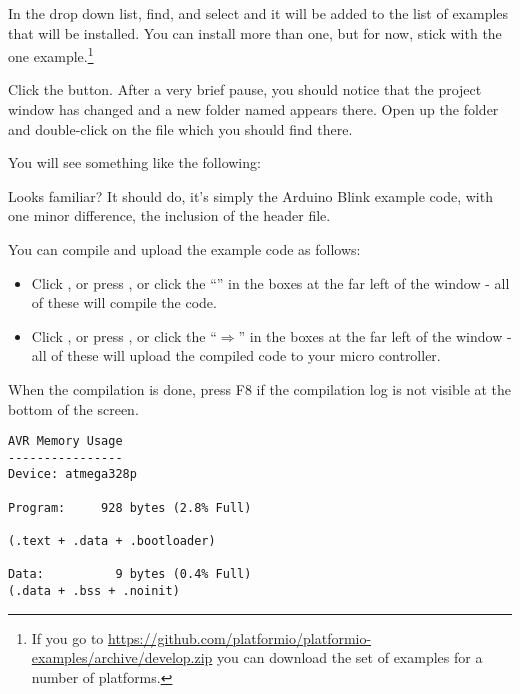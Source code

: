 In the drop down list, find, and select  and it will be added to the list of examples that will be installed. You can install more than one, but for now, stick with the one example.\footnote{If you go to \url{https://github.com/platformio/platformio-examples/archive/develop.zip} you can download the set of examples for a number of platforms.}

Click the  button. After a very brief pause, you should notice that the project window has changed and a new folder named  appears there. Open up the  folder and double-click on the file  which you should find there.

You will see something like the following:



Looks familiar? It should do, it's simply the Arduino Blink example code, with one minor difference, the inclusion of the  header file.

You can compile and upload the example code as follows:

\begin{itemize}
	\item Click , or press , or click the ``\checkmark'' in the boxes at the far left of the window - all of these will compile the code.
	
	\item Click , or press , or click the ``$\Rightarrow$'' in the boxes at the far left of the window - all of these will upload the compiled code to your micro controller.
\end{itemize}

When the compilation is done, press F8 if the compilation log is not visible at the bottom of the screen.

\begin{lstlisting}[numbers={none},caption={Arduino Blink Memory Usage}]
AVR Memory Usage
----------------
Device: atmega328p

Program:     928 bytes (2.8% Full)

(.text + .data + .bootloader)

Data:          9 bytes (0.4% Full)
(.data + .bss + .noinit)
\end{lstlisting}

